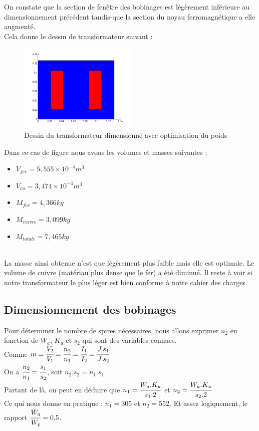 On constate que la section de fenêtre des bobinages est légèrement inférieure au dimensionnement précédent tandis-que la section du noyau ferromagnétique a elle augmenté.\\

\newpage
Cela donne le dessin de transformateur suivant :\\
\begin{figure}[h]
	\begin{center}
	\includegraphics[width=0.5\textwidth]{images/TP1_transfo_poids}
	\caption{Dessin du transformateur dimensionné avec optimisation du poids}\label{img:dessinTransfoPoids}
	\end{center}
\end{figure}
\FloatBarrier 

Dans ce cas de figure nous avons les volumes et masses suivantes : \\
\begin{itemize}
\item $V_{fer} = 5,555 \times{}10^{-4} m^3$
\item $V_{cu} = 3,474 \times{}10^{-4} m^3$
\item $M_{fer} = 4,366 kg$
\item $M_{cuivre} = 3,099 kg $
\item $M_{totale} = 7,465 kg $
\end{itemize}~\\

La masse ainsi obtenue n'est que légèrement plus faible mais elle est optimale. Le volume de cuivre (matériau plus dense que le fer) a été diminué. Il reste à voir si notre transformateur le plus léger est bien conforme à notre cahier des charges.\\

\subsection{Dimensionnement des bobinages}
Pour déterminer le nombre de spires nécessaires, nous allons exprimer $n_2$ en fonction de $W_a$, $K_u$ et $s_2$ qui sont des variables connues.\\
Comme $ m = \cfrac{V_2}{V_1} = \cfrac{n_2}{n_1} = \cfrac{I_1}{I_2} = \cfrac{J.s_1}{J.s_2}$ \\
On a $ \cfrac{n_2}{n_1} = \cfrac{s_1}{s_2} $, soit $ n_2.s_2 = n_1.s_1 $\\
Partant de là, on peut en déduire que $n_1 = \cfrac{W_a.K_u}{s_1.2}$ et $n_2 = \cfrac{W_a.K_u}{s_2.2}$\\
Ce qui nous donne en pratique : $n_1 = 305$ et $n_2 = 552$. Et assez logiquement, le rapport $\cfrac{W_a}{W_p}=0.5$.
	

